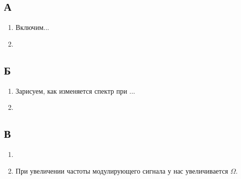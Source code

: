 \documentclass[a4paper, 12pt]{article}%
\begin{document}
\subsection*{А}

\begin{enumerate}

\item Включим...

\item 

\end{enumerate}

\subsection*{Б}

\begin{enumerate}

\item Зарисуем, как изменяется спектр при ...

\item 

\end{enumerate}

\subsection*{В}

\begin{enumerate}

\item 

\item При увеличении частоты модулирующего сигнала у нас увеличивается $\Omega$.

\end{enumerate}
\end{document}
